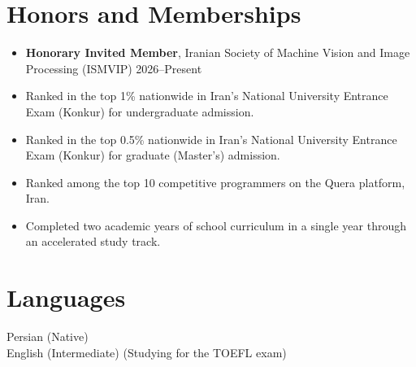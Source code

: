 \documentclass[10.5pt, letterpaper]{article}
\begin{document}
\section{Honors and Memberships}

\begin{itemize}
    \item \textbf{Honorary Invited Member}, Iranian Society of Machine Vision and Image Processing (ISMVIP) \hfill 2026--Present
    \item Ranked in the top 1\% nationwide in Iran's National University Entrance Exam (Konkur) for undergraduate admission.
    \item Ranked in the top 0.5\% nationwide in Iran's National University Entrance Exam (Konkur) for graduate (Master's) admission.
    \item Ranked among the top 10 competitive programmers on the Quera platform, Iran.
    \item Completed two academic years of school curriculum in a single year through an accelerated study track.
\end{itemize}
\section{Languages}

Persian (Native)\\
English (Intermediate) (Studying for the TOEFL exam)
\end{document}
